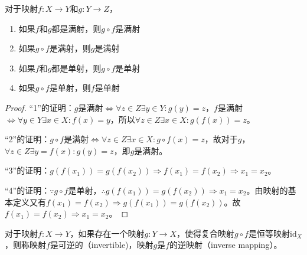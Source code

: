 \documentclass[main.tex]{subfiles}
\begin{document}
\begin{theorem}
对于映射$f:X\rightarrow Y$和$g: Y\rightarrow Z$，
\begin{enumerate}
    \item 如果$f$和$g$都是满射，则$g\circ f$是满射
    \item 如果$g\circ f$是满射，则$g$是满射
    \item 如果$f$和$g$都是单射，则$g\circ f$是单射
    \item 如果$g\circ f$是单射，则$f$是单射
\end{enumerate}
\end{theorem}
\begin{proof}
“1”的证明：$g$是满射$\Leftrightarrow\forall z\in Z\exists y\in Y:g\left(y\right)=z$，$f$是满射$\Leftrightarrow\forall y\in Y\exists x\in X:f\left(x\right)=y$，所以$\forall z\in Z\exists x\in X:g\left(f\left(x\right)\right)=z$。

“2”的证明：$g\circ f$是满射$\Leftrightarrow\forall z\in Z\exists x\in X:g\circ f\left(x\right)=z$，故对于$g$，$\forall z\in Z\exists y=f\left(x\right):g\left(y\right)=z$，即$g$是满射。

“3”的证明：$g\left(f\left(x_1\right)\right)=g\left(f\left(x_2\right)\right)\Rightarrow f\left(x_1\right)=f\left(x_2\right)\Rightarrow x_1=x_2$。

“4”的证明：$\because g\circ f$是单射，$\therefore g\left(f\left(x_1\right)\right)=g\left(f\left(x_2\right)\right)\Rightarrow x_1=x_2$。由映射的基本定义又有$f\left(x_1\right)=f\left(x_2\right)\Rightarrow g\left(f\left(x_1\right)\right)=g\left(f\left(x_2\right)\right)$。故$f\left(x_1\right)=f\left(x_2\right)\Rightarrow x_1=x_2$。
\end{proof}


\begin{definition}[逆映射]\label{def:II.1.14}
对于映射$f:X\rightarrow Y$，如果存在一个映射$g:Y\rightarrow X$，使得复合映射$g\circ f$是恒等映射$\mathrm{id}_X$，则称映射$f$是可逆的（invertible)，映射$g$是$f$的逆映射（inverse mapping）。
\end{definition}
\end{document}
